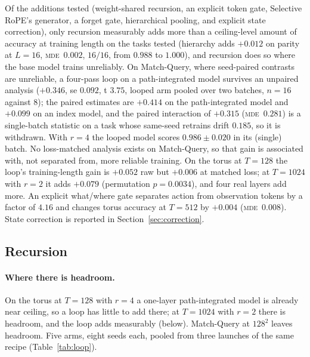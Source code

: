 \documentclass[10pt]{article}
\newcommand{\mde}{\textsc{mde}}
\begin{document}
Of the additions tested (weight-shared recursion, an explicit token gate, Selective RoPE's generator, a
forget gate, hierarchical pooling, and explicit state correction), only recursion measurably adds more than
a ceiling-level amount of accuracy at training length on the tasks tested (hierarchy adds $+0.012$ on parity at
$L=16$, \mde\ $0.002$, $16/16$, from $0.988$ to $1.000$), and recursion does so where the base model trains unreliably.
On Match-Query, where seed-paired contrasts are unreliable, a four-pass loop on a path-integrated model
survives an unpaired analysis ($+0.346$, se $0.092$, t $3.75$, looped arm pooled over two batches, $n=16$
against $8$); the paired estimates are $+0.414$ on the path-integrated model and $+0.099$ on an index model,
and the paired interaction of $+0.315$ (\mde\ $0.281$) is a single-batch statistic on a task whose same-seed
retrains drift $0.185$, so it is withdrawn. With $r=4$ the looped model scores $0.986\pm0.020$ in its
(single) batch. No loss-matched analysis exists on Match-Query, so that gain
is associated with, not separated from, more reliable training. On the torus at $T=128$ the loop's training-length gain
is $+0.052$ raw but $+0.006$ at matched loss; at $T=1024$ with $r=2$ it adds $+0.079$ (permutation $p=0.0034$),
and four real layers add more. An explicit what/where gate separates action from observation tokens by a
factor of $4.16$ and changes torus accuracy at $T=512$ by $+0.004$ (\mde\ $0.008$). State correction is
reported in Section~\ref{sec:correction}.

\subsection{Recursion}
\label{sec:c5-loop}

\paragraph{Where there is headroom.} On the torus at $T=128$ with $r=4$ a one-layer path-integrated model is already near
ceiling, so a loop has little to add there; at $T=1024$ with $r=2$ there is headroom, and the loop adds
measurably (below). Match-Query at $128^2$ leaves headroom. Five arms,
eight seeds each, pooled from three launches of the same recipe (Table~\ref{tab:loop}).
\end{document}
